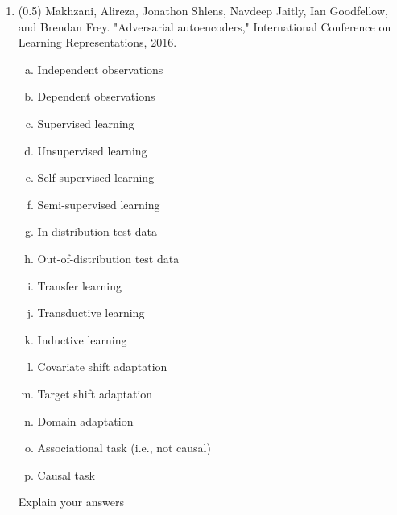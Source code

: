 \documentclass{article}
\begin{document}
\begin{enumerate}
\newpage
\item (0.5) Makhzani, Alireza, Jonathon Shlens, Navdeep Jaitly, Ian Goodfellow, and Brendan Frey. "Adversarial autoencoders," International Conference on Learning Representations, 2016. 
\begin{enumerate}[(a)]
\item Independent observations
\item Dependent observations
\item Supervised learning
\item Unsupervised learning
\item Self-supervised learning
\item Semi-supervised learning
\item In-distribution test data
\item Out-of-distribution test data
\item Transfer learning
\item Transductive learning
\item Inductive  learning
\item Covariate shift adaptation
\item Target shift adaptation
\item Domain adaptation
\item Associational task (i.e., not causal)
\item Causal task
\end{enumerate}
Explain your answers\\
 \underline{\hspace{6in}}\\
 \underline{\hspace{6in}}\\
 \underline{\hspace{6in}}\\
 \underline{\hspace{6in}}\\
 \underline{\hspace{6in}}\\
 \underline{\hspace{6in}}\\
 \underline{\hspace{6in}}\\
 \underline{\hspace{6in}}\\
 \underline{\hspace{6in}}\\
 \underline{\hspace{6in}}\\
 \underline{\hspace{6in}}\\
 \underline{\hspace{6in}}\\
 \underline{\hspace{6in}}\\
 \underline{\hspace{6in}}\\
 \underline{\hspace{6in}}\\
 

\end{enumerate}
\end{document}
